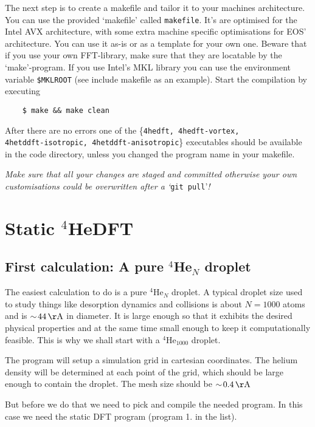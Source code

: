 \documentclass[10pt,a4paper]{article}
\begin{document}
	The next step is to create a makefile and tailor it to your machines architecture. You can use the provided `makefile' called \verb|makefile|. It's are optimised for the Intel AVX architecture, with some extra machine specific optimisations for EOS' architecture. You can use it as-is or as a template for your own one. Beware that if you use your own FFT-library, make sure that they are locatable by the `make'-program. If you use Intel's MKL library you can use the environment variable \verb|$MKLROOT| (see include makefile as an example). Start the compilation by executing
	\begin{verbatim}
	$ make && make clean
	\end{verbatim}
	After there are no errors one of the \{\verb|4hedft, 4hedft-vortex,| \\ \verb|4hetddft-isotropic, 4hetddft-anisotropic|\} executables should be available in the code directory, unless you changed the program name in your makefile.
	
	{\color{red}\emph{Make sure that all your changes are staged and committed otherwise your own customisations could be overwritten after a `}\verb|git pull|'\emph{!}}
	
	\newpage
	\section{Static $^4$HeDFT}
	
	\subsection{First calculation: A pure $^4$He$_N$ droplet}
	The easiest calculation to do is a pure $^4$He$_N$ droplet. A typical droplet size used to study things like desorption dynamics and collisions is about $N=1000$ atoms and is $\sim\!44\,\mathrm{\AA}$ in diameter. It is large enough so that it exhibits the desired physical properties and at the same time small enough to keep it computationally feasible. This is why we shall start with a $^4$He$_{1000}$ droplet.
	
	The program will setup a simulation grid in cartesian coordinates. The helium density will be determined at each point of the grid, which should be large enough to contain the droplet. The mesh size should be $\sim\!0.4\,\mathrm{\AA}$
	
	But before we do that we need to pick and compile the needed program. In this case we need the static DFT program (program 1. in the list).
	
\end{document}
